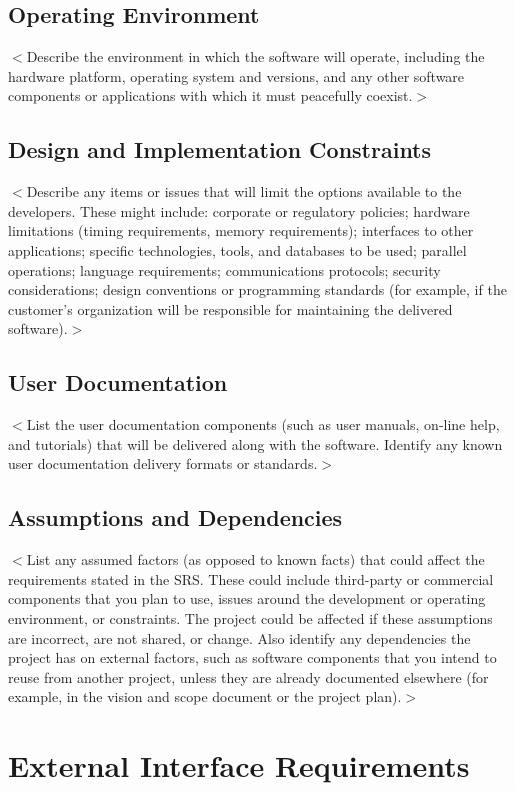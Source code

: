 \documentclass[a4paper, 11pt]{scrreprt}
\begin{document}
\section{Operating Environment}
$<$Describe the environment in which the software will operate, including the 
hardware platform, operating system and versions, and any other software 
components or applications with which it must peacefully coexist.$>$

\section{Design and Implementation Constraints}
$<$Describe any items or issues that will limit the options available to the 
developers. These might include: corporate or regulatory policies; hardware 
limitations (timing requirements, memory requirements); interfaces to other 
applications; specific technologies, tools, and databases to be used; parallel 
operations; language requirements; communications protocols; security 
considerations; design conventions or programming standards (for example, if the 
customer's organization will be responsible for maintaining the delivered 
software).$>$

\section{User Documentation}
$<$List the user documentation components (such as user manuals, on-line help, 
and tutorials) that will be delivered along with the software. Identify any 
known user documentation delivery formats or standards.$>$
\section{Assumptions and Dependencies}

$<$List any assumed factors (as opposed to known facts) that could affect the 
requirements stated in the SRS. These could include third-party or commercial 
components that you plan to use, issues around the development or operating 
environment, or constraints. The project could be affected if these assumptions 
are incorrect, are not shared, or change. Also identify any dependencies the 
project has on external factors, such as software components that you intend to 
reuse from another project, unless they are already documented elsewhere (for 
example, in the vision and scope document or the project plan).$>$


\chapter{External Interface Requirements}
\end{document}
